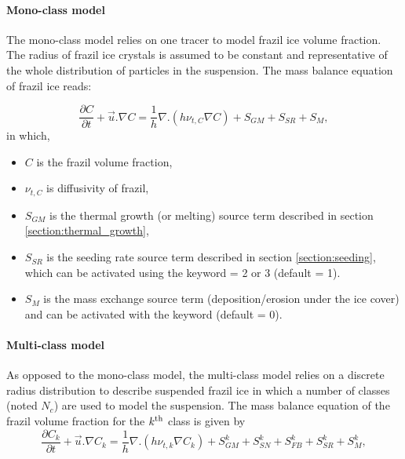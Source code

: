 \paragraph{Mono-class model}
The mono-class model relies on one tracer to model frazil ice volume fraction.
The radius of frazil ice crystals is assumed to be constant and representative of the whole
distribution of particles in the suspension. The mass balance equation of frazil ice reads:

\begin{equation}
  \frac{\partial C}{\partial t} + \vec{u} . \nabla C = \dfrac{1}{h} \nabla . \left( h \nu_{t,C}  \nabla C \right) +  S_{GM} + S_{SR} + S_M,
\label{eq:model:frazil}
\end{equation}
in which,
\begin{itemize}
	\item $C$ is the frazil volume fraction,
	\item $\nu_{t,C}$ is diffusivity of frazil,
	\item $S_{GM}$ is the thermal growth (or melting) source term described in section \ref{section:thermal_growth},
	\item $S_{SR}$ is the seeding rate source term described in section \ref{section:seeding}, which can be activated using the keyword  = 2 or 3 (default = 1).
  \item $S_M$ is the mass exchange source term (deposition/erosion under the ice cover) and can be activated with the keyword  (default = 0).
\end{itemize}

\paragraph{Multi-class model}
As opposed to the mono-class model, the multi-class model relies on
a discrete radius distribution to describe suspended frazil ice in which
a number of classes (noted $N_c$) are used to model the suspension.
The mass balance equation of the frazil volume fraction for the $k^{\rm{th}}$ class is given by
\begin{equation}
\frac{\partial C_{k}}{\partial t} + \vec{u} . \nabla C_{k} = \dfrac{1}{h}  \nabla . \left( h\nu_{t,k}  \nabla C_k \right) +  S_{GM}^{k} + S_{SN}^{k} + S_{FB}^{k} + S_{SR}^{k} + S_M^k,
\label{eq:model:frazil}
\end{equation}

